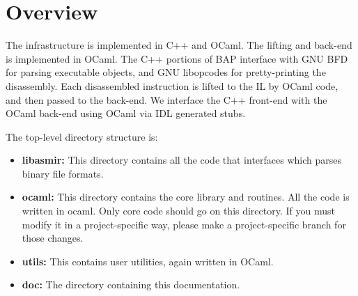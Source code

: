 \section{Overview}

The \bap infrastructure is implemented in C++ and OCaml.  The lifting
and back-end is implemented in OCaml. The C++ portions of BAP
interface with GNU BFD for parsing executable objects, and GNU
libopcodes for pretty-printing the disassembly. Each disassembled
instruction is lifted to the IL by OCaml code, and then passed to the
back-end.  We interface the C++ front-end with the OCaml back-end
using OCaml via IDL generated stubs.


The \bap top-level directory structure is:
\begin{itemize}
\item {\bf libasmir:} This directory contains all the code that
  interfaces which parses binary file formats.

\item {\bf ocaml:} This directory contains the core \bap library and
  routines. All the code is written in ocaml. Only core \bap code
  should go on this directory. If you must modify it in a
  project-specific way, please make a project-specific branch for
  those changes.

\item {\bf utils:} This contains user utilities, again written in OCaml.

\item {\bf doc:} The directory containing this documentation.
\end{itemize}


